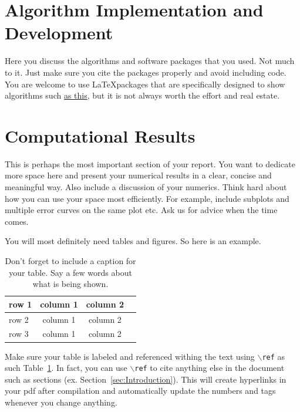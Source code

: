 \documentclass[11pt]{amsart}
\begin{document}
\section{Algorithm Implementation and Development}\label{sec:algorithms}
Here you discuss the algorithms and software packages that you used. Not much to it. 
Just make sure you cite the packages properly and avoid including code. 
You are welcome to use \LaTeX packages that are specifically designed to show 
algorithms such \href{https://www.overleaf.com/learn/latex/Algorithms}{as this}, but it is 
not always worth the effort and real estate. 


\section{Computational Results}\label{sec:results}

This is perhaps the most important section of your report. You want to dedicate more space 
here and present your numerical results in a clear, concise and meaningful way. Also 
include a discussion of your numerics. Think hard about how you can use 
your space most efficiently. For example, include subplots and multiple error curves on the 
same plot etc. Ask us for advice when the time comes. 

You will most definitely need tables and figures. So here is an example. 

\begin{table}[htp]
    \centering
    \begin{tabular}{| l | c|c | r |}
         \hline
         row 1 & column 1  & column 2  \\ \hline
         row 2 & column 1 & column 2 \\ 
         row 3 & column 1 & column 2 \\ \hline
    \end{tabular}
    \caption{Don't forget to include a caption for your table. Say a few words about what is 
    being shown.}
    \label{tab:meaningful-label}
\end{table}

Make sure your table is labeled and referenced withing the text using $\backslash$\texttt{ref} as such Table~\ref{tab:meaningful-label}. In fact, you can 
use $\backslash$\texttt{ref} to cite anything else in the document such as 
sections (ex. Section~\ref{sec:Introduction}). This will create hyperlinks in your 
pdf after compilation and automatically update the numbers and tags whenever you change 
anything. 
\end{document}
